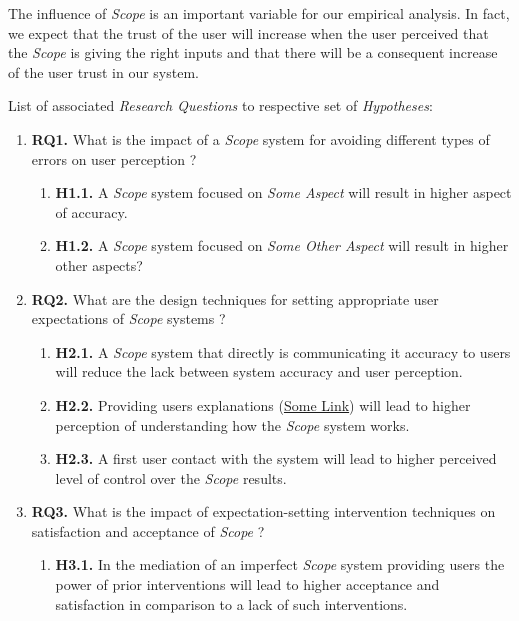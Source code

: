 \hfill

The influence of \textit{Scope} is an important variable for our empirical analysis. In fact, we expect that the trust of the user will increase when the user perceived that the \textit{Scope} is giving the right inputs and that there will be a consequent increase of the user trust in our system.

\clearpage

List of associated {\it Research Questions} to respective set of {\it Hypotheses}:

\begin{enumerate}
\item {\bf RQ1.} What is the impact of a {\it Scope} system for avoiding different types of errors on user perception ?
\begin{enumerate}
\item {\bf H1.1.} A {\it Scope} system focused on {\it Some Aspect} will result in higher aspect of accuracy.
\item {\bf H1.2.} A {\it Scope} system focused on {\it Some Other Aspect} will result in higher other aspects?
\end{enumerate}
\item {\bf RQ2.} What are the design techniques for setting appropriate user expectations of {\it Scope} systems ?
\begin{enumerate}
\item {\bf H2.1.} A {\it Scope} system that directly is communicating it accuracy to users will reduce the lack between system accuracy and user perception. 
\item {\bf H2.2.} Providing users explanations (\hyperlink{}{Some Link}) will lead to higher perception of understanding how the {\it Scope} system works.
\item {\bf H2.3.} A first user contact with the system will lead to higher perceived level of control over the {\it Scope} results.
\end{enumerate}
\item {\bf RQ3.} What is the impact of expectation-setting intervention techniques on satisfaction and acceptance of {\it Scope} ?
\begin{enumerate}
\item {\bf H3.1.} In the mediation of an imperfect {\it Scope} system providing users the power of prior interventions will lead to higher acceptance and satisfaction in comparison to a lack of such interventions.
\end{enumerate}
\end{enumerate}